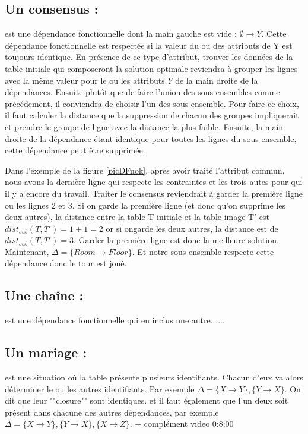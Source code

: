 \documentclass[12pt, a4paper, oneside, titlepage]{book}%
\begin{document}
\subsection{Un consensus : } 
est une dépendance fonctionnelle dont la main gauche est vide : $\emptyset \rightarrow Y$. Cette dépendance fonctionnelle est respectée si la valeur du ou des attributs de Y est toujours identique. En présence de ce type d'attribut, trouver les données de la table initiale qui composeront la solution optimale reviendra à grouper les lignes avec la même valeur pour le ou les attributs $Y$ de la main droite de la dépendances. Ensuite plutôt que de faire l'union des sous-ensembles comme précédement, il conviendra de choisir l'un des sous-ensemble. Pour faire ce choix, il faut calculer la distance que la suppression de chacun des groupes impliquerait et prendre le groupe de ligne avec la distance la plus faible. Ensuite, la main droite de la dépendance étant identique pour toutes les lignes du sous-ensemble, cette dépendance peut être supprimée.

Dans l'exemple de la figure \ref{picDFnok}, après avoir traité l'attribut commun, nous avons la dernière ligne qui respecte les contraintes et les trois autes pour qui il y a encore du travail. Traiter le consensus reviendrait à garder la première ligne ou les lignes 2 et 3. Si on garde la première ligne (et donc qu'on supprime les deux autres), la distance entre la table T initiale et la table image T' est $dist_{sub}(T, T') = 1+ 1 = 2$ or si ongarde les deux autres, la distance est de $dist_{sub}(T, T') = 3$. Garder la première ligne est donc la meilleure solution. Maintenant, $\Delta = \{  Room \rightarrow Floor \}$. Et notre sous-ensemble respecte cette dépendance donc le tour est joué.

\subsection{Une chaîne : } 
est une dépendance fonctionnelle qui en inclus une autre.
....

\subsection{ Un mariage : }
est une situation où la table présente plusieurs identifiants. Chacun d'eux va alors déterminer le ou les autres identifiants. Par exemple $\Delta = \{  X \rightarrow Y \}, \{  Y \rightarrow X \}$. On dit que leur ""closure"" sont identiques. et il faut également que l'un deux soit présent dans chacune des autres dépendances, par exemple $\Delta = \{  X \rightarrow Y \}, \{  Y \rightarrow X \}, \{ X \rightarrow Z\}$.
+ complément video 0:8:00
\end{document}
